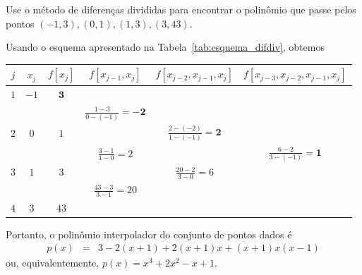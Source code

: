 \begin{ex}
Use o método de diferenças divididas para encontrar o polinômio que passe pelos pontos $(-1,3),(0,1),(1,3),(3,43)$.
\end{ex}
\begin{sol}
Usando o esquema apresentado na Tabela~\ref{tab:esquema_difdiv}, obtemos
\begin{center}
\begin{tabular}{c||c|cccc}\hline
 $j$ & $x_j$ & $f[x_j]$ & $f[x_{j-1},x_j]$ & $f[x_{j-2},x_{j-1},x_j]$ & $f[x_{j-3},x_{j-2},x_{j-1},x_j]$\\\hline
$1$ & $-1$ & $\pmb{3}$&&&\\
&&&$\displaystyle \frac{1-3}{0-(-1)}=\pmb{-2}$&&\\
$2$&$0$&$1$&&$\displaystyle \frac{2-(-2)}{1-(-1)}=\pmb{2}$&\\
&&&$\displaystyle \frac{3-1}{1-0}=2$&&$\displaystyle\frac{6-2}{3-(-1)}=\pmb{1}$\\
$3$&$1$&$3$&&$\displaystyle \frac{20-2}{3-0}=6$&\\
&&&$\displaystyle \frac{43-3}{3-1}=20$&&\\
$4$&$3$&$43$&&&\\\hline
\end{tabular}
\end{center}
Portanto, o polinômio interpolador do conjunto de pontos dados é
\begin{eqnarray*}
p(x)&=&3-2(x+1)+2(x+1)x+(x+1)x(x-1)
\end{eqnarray*}
ou, equivalentemente, $p(x) = x^3+2x^2-x+1$.


\end{sol}
